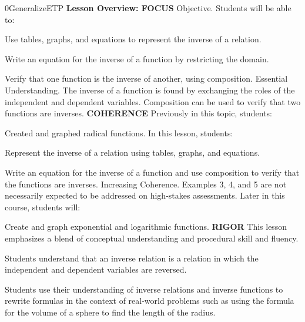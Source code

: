\documentclass{article}
\newenvironment{te-addendum}[2]{}{}     %
\begin{document}
\begin{te-addendum}{0}{GeneralizeETP}
\textbf{Lesson Overview: FOCUS}
Objective. Students will be able to:
\item Use tables, graphs, and equations to represent the inverse of a relation.
\item Write an equation for the inverse of a function by restricting the domain.
\item Verify that one function is the inverse of another, using composition.
Essential Understanding. The inverse of a function is found by exchanging the roles of the independent and dependent variables. Composition can be used to verify that two functions are inverses.
\textbf{COHERENCE}
Previously in this topic, students:
\item Created and graphed radical functions.
In this lesson, students:
\item Represent the inverse of a relation using tables, graphs, and equations.
\item Write an equation for the inverse of a function and use composition to verify that the functions are inverses.
Increasing Coherence. Examples 3, 4, and 5 are not necessarily expected to be addressed on high-stakes assessments.
Later in this course, students will:
\item Create and graph exponential and logarithmic functions.
\textbf{RIGOR}
This lesson emphasizes a blend of conceptual understanding and procedural skill and fluency.
\item Students understand that an inverse relation is a relation in which the independent and dependent variables are reversed.
\item Students use their understanding of inverse relations and inverse functions to rewrite formulas in the context of real-world problems such as using the formula for the volume of a sphere to find the length of the radius.
\end{te-addendum}
\end{document}
